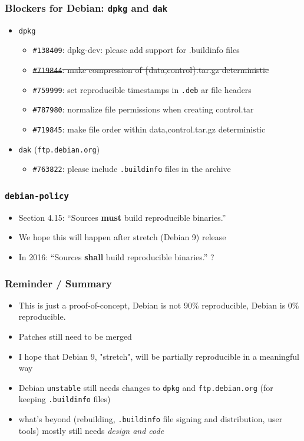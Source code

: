 \documentclass[14pt]{beamer}
\begin{document}
\begin{frame}
 \frametitle{Blockers for Debian: \texttt{dpkg} and \texttt{dak}}
 \begin{itemize}
  \item \texttt{dpkg}
 \begin{itemize}
  \item \texttt{\#138409}: dpkg-dev: please add support for .buildinfo files
  \item \sout{\texttt{\#719844}: make compression of \{data,control\}.tar.gz deterministic}
  \item \texttt{\#759999}: set reproducible timestamps in \texttt{.deb} ar file headers
  \item \texttt{\#787980}: normalize file permissions when creating control.tar
  \item \texttt{\#719845}: make file order within {data,control}.tar.gz deterministic
 \end{itemize}
 \item \texttt{dak} (\texttt{ftp.debian.org})
 \begin{itemize}
  \item \texttt{\#763822}: please include \texttt{.buildinfo} files in the archive
 \end{itemize}
 \end{itemize}
\end{frame}

\begin{frame}
 \frametitle{\texttt{debian-policy}}

 \begin{itemize}
  \item Section 4.15: “Sources \textbf{must} build reproducible binaries.”
  \item<2-3> We hope this will happen after stretch (Debian 9) release
  \item<3> In 2016: “Sources \textbf{shall} build reproducible binaries.” ?
 \end{itemize}
\end{frame}

\begin{frame}
 \frametitle{Reminder / Summary}
 \begin{itemize}
  \item This is just a proof-of-concept, Debian is not 90\% reproducible,
  Debian is 0\% reproducible.
  \item Patches still need to be merged
  \item<2-4> I hope that Debian 9, "stretch", will be partially reproducible in a meaningful way
  \item<3-4> Debian \texttt{unstable} still needs changes to \texttt{dpkg} and
  \texttt{ftp.debian.org} (for keeping \texttt{.buildinfo} files)
  \item<4> what's beyond (rebuilding, \texttt{.buildinfo} file signing and
  distribution, user tools) mostly still needs \it{design} and code

 \end{itemize}
\end{frame}
\end{document}
